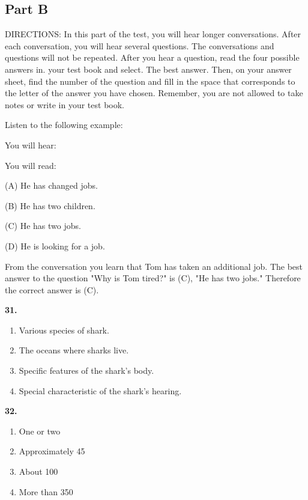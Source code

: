 \documentclass[12pt]{article}
\begin{document}
\subsection*{Part B}
DIRECTIONS: In this part of the test, you will hear longer conversations. After each conversation, you will hear several questions. The conversations and questions will not be repeated. After you hear a question, read the four possible answers in. your test book and select. The best answer. Then, on your answer sheet, find the number of the question and fill in the space that corresponds to the letter of the answer you have chosen. Remember, you are not allowed to take notes or write in your test book.\par
\begin{exampleblock}
Listen to the following example:\par
You will hear:\par
You will read:\par
(A) He has changed jobs.\par
(B) He has two children.\par
(C) He has two jobs.\par
(D) He is looking for a job.\par
From the conversation you learn that Tom has taken an additional job. The best answer to the question "Why is Tom tired?" is (C), "He has two jobs." Therefore the correct answer is (C).\par
\end{exampleblock}
\noindent\textbf{31.}
\begin{enumerate}[label=(\Alph*),leftmargin=*,itemsep=0.2em]
\item Various species of shark.
\item The oceans where sharks live.
\item Specific features of the shark's body.
\item Special characteristic of the shark's hearing.
\end{enumerate}
\par
\vspace{0.25\baselineskip}
\noindent\textbf{32.}
\begin{enumerate}[label=(\Alph*),leftmargin=*,itemsep=0.2em]
\item One or two
\item Approximately 45
\item About 100
\item More than 350
\end{enumerate}
\par
\end{document}
